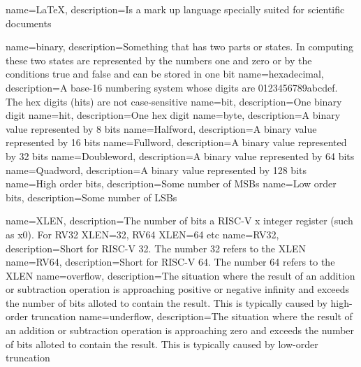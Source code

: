 {
    name=LaTeX,
    description={Is a mark up language specially suited
    for scientific documents}
}

{
	name=binary,
	description={Something that has two parts or states.  In computing
		these two states are represented by the numbers one and zero or
		by the conditions true and false and can be stored in one bit}
}
{
	name=hexadecimal,
	description={A base-16 numbering system whose digits are 
		0123456789abcdef.  The hex digits (hits) are not case-sensitive}
}
{
	name=bit,
	description={One binary digit}
}
{
	name={hit},
	description={One hex digit}
}
{
	name=byte,
	description={A binary value represented by 8 bits}
}
{
	name={Halfword},
	description={A binary value represented by 16 bits}
}
{
	name={Fullword},
	description={A binary value represented by 32 bits}
}
{
	name={Doubleword},
	description={A binary value represented by 64 bits}
}
{
	name={Quadword},
	description={A binary value represented by 128 bits}
}
{
	name={High order bits},
	description={Some number of MSBs}
}
{
    name={Low order bits},
    description={Some number of LSBs}
}

{
	name=XLEN,
	description={The number of bits a RISC-V x integer register 
		(such as x0).  For RV32 XLEN=32, RV64 XLEN=64 etc}
}
{
	name=RV32,
	description={Short for RISC-V 32.  The number 32 refers to the XLEN}
}
{
	name=RV64,
	description={Short for RISC-V 64.  The number 64 refers to the XLEN}
}
{
	name=overflow,
	description={The situation where the result of an addition or 
		subtraction operation is approaching positive or negative 
		infinity and exceeds the number of bits alloted to contain 
		the result.  This is typically caused by high-order truncation}
}
{
	name=underflow,
	description={The situation where the result of an addition or 
		subtraction operation is approaching zero and exceeds the number 
		of bits alloted to contain the result.  This is typically
        caused by low-order truncation}
}

